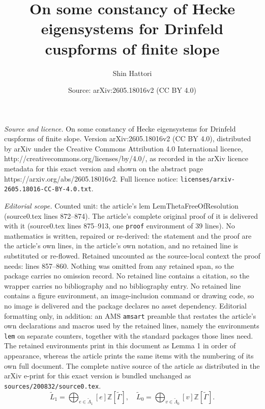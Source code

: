 \documentclass[10pt,a4paper]{amsart}
\title{On some constancy of Hecke eigensystems for Drinfeld cuspforms of finite slope}
\author{Shin Hattori}
\date{Source: arXiv:2605.18016v2 (CC BY 4.0)}
\newcommand{\bZ}{\mathbb{Z}}
\begin{document}
\maketitle

\noindent\emph{Source and licence.} On some constancy of Hecke eigensystems for Drinfeld cuspforms of finite slope. Version arXiv:2605.18016v2 (CC BY 4.0), distributed by arXiv under the Creative Commons Attribution 4.0 International licence, http://creativecommons.org/licenses/by/4.0/, as recorded in the arXiv licence metadata for this exact version and shown on the abstract page https://arxiv.org/abs/2605.18016v2. Full licence notice: \texttt{licenses/arxiv-2605.18016-CC-BY-4.0.txt}.\par\smallskip

\noindent\textit{Editorial scope.} Counted unit: the article's lem LemThetaFreeOfResolution (source0.tex lines 872--874). The article's complete original proof of it is delivered with it (source0.tex lines 875--913, one \texttt{proof} environment of 39 lines). No mathematics is written, repaired or re-derived: the statement and the proof are the article's own lines, in the article's own notation, and no retained line is substituted or re-flowed.  Retained uncounted as the source-local context the proof needs: lines 857--860.  Nothing was omitted from any retained span, so the package carries no omission record.  No retained line contains a citation, so the wrapper carries no bibliography and no bibliography entry.  No retained line contains a figure environment, an image-inclusion command or drawing code, so no image is delivered and the package declares no asset dependency.  Editorial formatting only, in addition: an AMS \texttt{amsart} preamble that restates the article's own declarations and macros used by the retained lines, namely the environments \texttt{lem} on separate counters, together with the standard packages those lines need.  The retained environments print in this document as Lemma 1 in order of appearance, whereas the article prints the same items with the numbering of its own full document.  The complete native source of the article as distributed in the arXiv e-print for this exact version is bundled unchanged as \texttt{sources/200832/source0.tex}.
\begin{equation}\label{EqnResolAreFree}
\tilde{L}_1=\bigoplus_{e\in \tilde{\Lambda}_{1}}[e] \bZ[\tilde{\Gamma}],\quad 
\tilde{L}_0=\bigoplus_{v\in \tilde{\Lambda}_{0}}[v] \bZ[\tilde{\Gamma}].
\end{equation}
\end{document}
